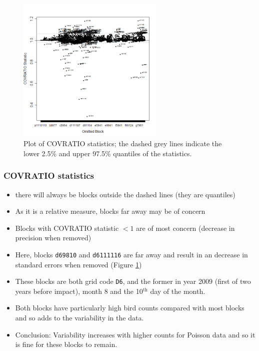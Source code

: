 \documentclass[11pt, a4paper]{article}
\begin{document}
\begin{frame}[fragile]
\begin{figure}[h]
  \centering
  \includegraphics[width=7cm]{InfluenceMeasures_covratio.png}
  \caption{Plot of COVRATIO statistics; the dashed grey lines indicate the lower 2.5\% and upper 97.5\% quantiles of the statistics.}
  \label{fig:influence1}
\end{figure}
\end{frame}

\begin{frame}[fragile]
\frametitle{COVRATIO statistics}
\begin{itemize}
  \item there will always be blocks outside the dashed lines (they are quantiles)
  \item As it is a relative measure, blocks far away may be of concern
  \item Blocks with COVRATIO statistic $< 1$ are of most concern (decrease in precision when removed) 
  \item Here, blocks {\tt d69810} and {\tt d6111116} are far away and result in an decrease in standard errors when removed (Figure \ref{fig:influence1})
  \item These blocks are both grid code {\tt D6}, and the former in year 2009 (first of two years before impact), month 8 and the 10$^{\textrm{th}}$ day of the month.  
  \item Both blocks have particularly high bird counts compared with most blocks and so adds to the variability in the data.
  \bigskip
  \item Conclusion: Variability increases with higher counts for Poisson data and so it is fine for these blocks to remain. 
  \end{itemize}
\end{frame}
\end{document}
